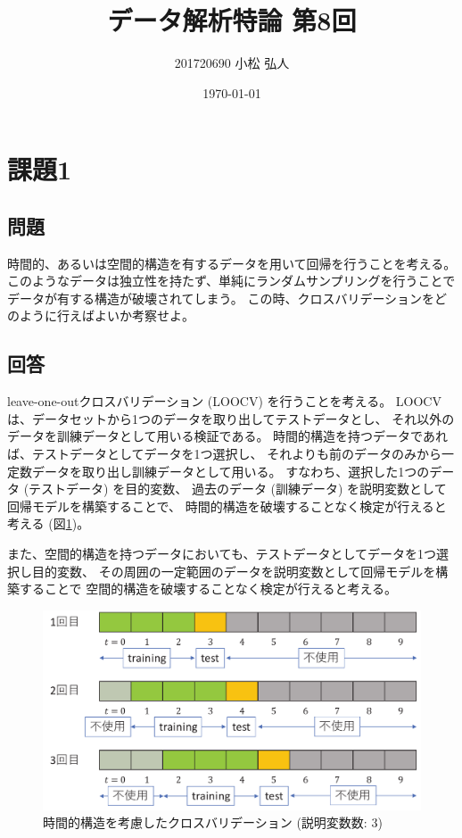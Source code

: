 \documentclass{jsarticle}
\title{データ解析特論 第8回}
\author{201720690 小松 弘人}
\date{\today}
\begin{document}
\maketitle
\thispagestyle{empty}
\section{課題1}
\subsection{問題}
時間的、あるいは空間的構造を有するデータを用いて回帰を行うことを考える。
このようなデータは独立性を持たず、単純にランダムサンプリングを行うことで
データが有する構造が破壊されてしまう。
この時、クロスバリデーションをどのように行えばよいか考察せよ。

\subsection{回答}
leave-one-outクロスバリデーション (LOOCV) を行うことを考える。
LOOCVは、データセットから1つのデータを取り出してテストデータとし、
それ以外のデータを訓練データとして用いる検証である。
時間的構造を持つデータであれば、テストデータとしてデータを1つ選択し、
それよりも前のデータのみから一定数データを取り出し訓練データとして用いる。
すなわち、選択した1つのデータ (テストデータ) を目的変数、
過去のデータ (訓練データ) を説明変数として回帰モデルを構築することで、
時間的構造を破壊することなく検定が行えると考える (図\ref{img:overview})。

また、空間的構造を持つデータにおいても、テストデータとしてデータを1つ選択し目的変数、
その周囲の一定範囲のデータを説明変数として回帰モデルを構築することで
空間的構造を破壊することなく検定が行えると考える。

\begin{figure}[b]
    \centering
    \includegraphics[width=.6\linewidth]{img/loocv.pdf}
    \caption{時間的構造を考慮したクロスバリデーション (説明変数数: 3)}
    \label{img:overview}
\end{figure}

\newpage
\end{document}
